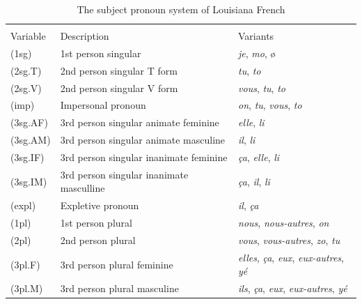\documentclass{article}\usepackage[]{graphicx}\usepackage[]{xcolor}
\newcommand{\lexi}[1]{\textit{#1}}
\begin{document}
      \begin{table}
        \centering
        \caption{The subject pronoun system of Louisiana French}
        \label{tab:lf_sub_pro}
        \begin{tabular}{l l l}
                    &                                          & \\
          Variable  & Description                              & Variants \\
          \hline
          (1sg)     & 1st person singular                      & \lexi{je}, \lexi{mo}, ø \\
          (2sg.T)   & 2nd person singular T form               & \lexi{tu}, \lexi{to} \\
          (2sg.V)   & 2nd person singular V form               & \lexi{vous}, \lexi{tu}, \lexi{to} \\
          (imp)     & Impersonal pronoun                       & \lexi{on}, \lexi{tu}, \lexi{vous}, \lexi{to} \\
          (3sg.AF)  & 3rd person singular animate feminine     & \lexi{elle}, \lexi{li} \\
          (3sg.AM)  & 3rd person singular animate masculine    & \lexi{il}, \lexi{li} \\
          (3sg.IF)  & 3rd person singular inanimate feminine   & \lexi{ça}, \lexi{elle}, \lexi{li} \\
          (3sg.IM)  & 3rd person singular inanimate masculline & \lexi{ça}, \lexi{il}, \lexi{li} \\
          (expl)    & Expletive pronoun                        & \lexi{il}, \lexi{ça} \\
          (1pl)     & 1st person plural                        & \lexi{nous}, \lexi{nous-autres}, \lexi{on} \\
          (2pl)     & 2nd person plural                        & \lexi{vous}, \lexi{vous-autres}, \lexi{zo}, \lexi{tu} \\
          (3pl.F)   & 3rd person plural feminine               & \lexi{elles}, \lexi{ça}, \lexi{eux}, \lexi{eux-autres}, \lexi{yé} \\
          (3pl.M)   & 3rd person plural masculine              & \lexi{ils}, \lexi{ça}, \lexi{eux}, \lexi{eux-autres}, \lexi{yé} \\
        \end{tabular}
      \end{table}
\end{document}
